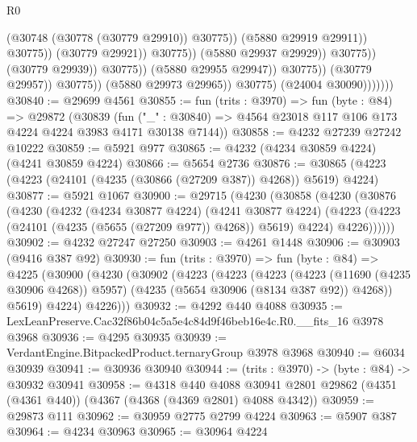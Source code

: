 \begin{lexlean}{R0}
\begin{coremodule}
                                                          (@30748 (@30778 (@30779 @29910)) @30775))
                                                        (@5880 @29919 @29911))
                                                      @30775))
                                                  (@30779 @29921))
                                                @30775))
                                            (@5880 @29937 @29929))
                                          @30775))
                                      (@30779 @29939))
                                    @30775))
                                (@5880 @29955 @29947))
                              @30775))
                          (@30779 @29957))
                        @30775))
                    (@5880 @29973 @29965))
                  @30775)
                (@24004 @30090)))))))
@30840 := @29699 @4561
@30855 := fun (trits : @3970) =>
  fun (byte : @84) =>
  @29872
    (@30839
      (fun ("_" : @30840) => @4564 @23018 @117 @106 @173 @4224 @4224 @3983 @4171 @30138 @7144))
@30858 := @4232 @27239 @27242 @10222
@30859 := @5921 @977
@30865 := @4232 (@4234 @30859 @4224) (@4241 @30859 @4224)
@30866 := @5654 @2736
@30876 := @30865 (@4223 (@4223 (@24101 (@4235 (@30866 (@27209 @387)) @4268)) @5619) @4224)
@30877 := @5921 @1067
@30900 := @29715
    (@4230
      (@30858
        (@4230
          (@30876
            (@4230
              (@4232
                (@4234 @30877 @4224)
                (@4241 @30877 @4224)
                (@4223 (@4223 (@24101 (@4235 (@5655 (@27209 @977)) @4268)) @5619) @4224)
                @4226))))))
@30902 := @4232 @27247 @27250
@30903 := @4261 @1448
@30906 := @30903 (@9416 @387 @92)
@30930 := fun (trits : @3970) =>
  fun (byte : @84) =>
  @4225
    (@30900
      (@4230
        (@30902
          (@4223
            (@4223
              (@4223
                (@4223 (@11690 (@4235 @30906 @4268)) @5957)
                (@4235 (@5654 @30906 (@8134 @387 @92)) @4268))
              @5619)
            @4224)
          @4226)))
@30932 := @4292 @440 @4088
@30935 := LexLeanPreserve.Cac32f86b04c5a5e4c84d9f46beb16e4c.R0.__fits_16 @3978 @3968
@30936 := @4295 @30935
@30939 := VerdantEngine.BitpackedProduct.ternaryGroup @3978 @3968
@30940 := @6034 @30939
@30941 := @30936 @30940
@30944 := (trits : @3970) -> (byte : @84) -> @30932 @30941
@30958 := @4318
    @440
    @4088
    @30941
    @2801
    @29862
    (@4351 (@4361 @440))
    (@4367 (@4368 (@4369 @2801) @4088 @4342))
@30959 := @29873 @111
@30962 := @30959 @2775 @2799 @4224
@30963 := @5907 @387
@30964 := @4234 @30963
@30965 := @30964 @4224

\end{coremodule}
\end{lexlean}
